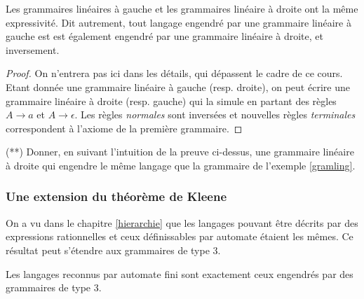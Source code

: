 \begin{lemma}
Les grammaires linéaires à gauche et les grammaires linéaire à droite ont la même expressivité. Dit autrement, tout langage engendré par une grammaire linéaire à gauche est est également engendré par une grammaire linéaire à droite, et inversement.
\end{lemma}

\begin{proof}
On n'entrera pas ici dans les détails, qui dépassent le cadre de ce cours. Etant donnée une grammaire linéaire à gauche (resp. droite), on peut écrire une grammaire linéaire à droite (resp. gauche) qui la simule en partant des règles $A \rightarrow a$ et $A \rightarrow \epsilon$. Les règles \textit{normales} sont inversées et nouvelles règles \textit{terminales} correspondent à l'axiome de la première grammaire. 
\end{proof}

\begin{exercice}(**) Donner, en suivant l'intuition de la preuve ci-dessus, une grammaire linéaire à droite qui engendre le même langage que la grammaire de l'exemple \ref{gramling}.
\end{exercice}

\subsubsection{Une extension du théorème de Kleene}
On a vu dans le chapitre \ref{hierarchie} que les langages pouvant être décrits par des expressions rationnelles et ceux définissables par automate étaient les mêmes. Ce résultat peut s'étendre aux grammaires de type 3.

\begin{theorem}
\label{kleeneplusplus}
Les langages reconnus par automate fini sont exactement ceux engendrés par des grammaires de type 3.
\end{theorem}

